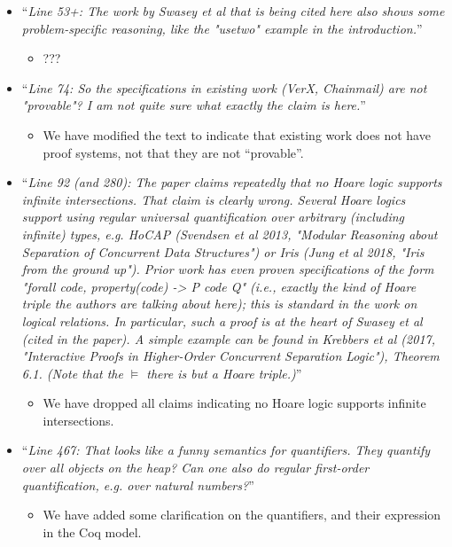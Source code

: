 \documentclass[11pt]{amsart}
\begin{document}
\begin{itemize}
\begin{itemize}
\item
``\emph{Line 53+: The work by Swasey et al that is being cited here also shows some problem-specific reasoning, like the "usetwo" example in the introduction.}''
\begin{itemize}
\item
???
\end{itemize}

\item
``\emph{Line 74: So the specifications in existing work (VerX, Chainmail) are not "provable"? I am not quite sure what exactly the claim is here.}''
\begin{itemize}
\item
We have modified the text to indicate that existing work does not have proof systems, not that they are not ``provable''.
\end{itemize}

\item
``\emph{Line 92 (and 280): The paper claims repeatedly that no Hoare logic supports infinite intersections. That claim is clearly wrong. Several Hoare logics support using regular universal quantification over arbitrary (including infinite) types, e.g. HoCAP (Svendsen et al 2013, "Modular Reasoning about Separation of Concurrent Data Structures") or Iris (Jung et al 2018, "Iris from the ground up"). Prior work has even proven specifications of the form "forall code, property(code) -> {P} code {Q}" (i.e., exactly the kind of Hoare triple the authors are talking about here); this is standard in the work on logical relations. In particular, such a proof is at the heart of Swasey et al (cited in the paper). A simple example can be found in Krebbers et al (2017, "Interactive Proofs in Higher-Order Concurrent Separation Logic"), Theorem 6.1. (Note that the $\vDash$ there is but a Hoare triple.)}''
\begin{itemize}
\item
We have dropped all claims indicating no Hoare logic supports infinite intersections.
\end{itemize}

\item
``\emph{Line 467: That looks like a funny semantics for quantifiers. They quantify over all objects on the heap? Can one also do regular first-order quantification, e.g. over natural numbers?}''
\begin{itemize}
\item
We have added some clarification on the quantifiers, and their expression in the Coq model.
\end{itemize}


\end{itemize}
\end{itemize}
\end{document}
